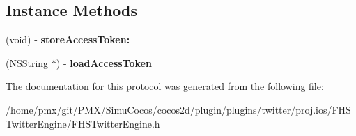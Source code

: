\subsection*{Instance Methods}
\begin{DoxyCompactItemize}
\item 
\mbox{\label{protocolFHSTwitterEngineAccessTokenDelegate_01-p_a9a79cf31ac9ba08b3f0f5dc10ecd35f0}} 
(void) -\/ {\bfseries store\+Access\+Token\+:}
\item 
\mbox{\label{protocolFHSTwitterEngineAccessTokenDelegate_01-p_a09906c4ccecb67614f20ee7e040686ec}} 
(N\+S\+String $\ast$) -\/ {\bfseries load\+Access\+Token}
\end{DoxyCompactItemize}


The documentation for this protocol was generated from the following file\+:\begin{DoxyCompactItemize}
\item 
/home/pmx/git/\+P\+M\+X/\+Simu\+Cocos/cocos2d/plugin/plugins/twitter/proj.\+ios/\+F\+H\+S\+Twitter\+Engine/F\+H\+S\+Twitter\+Engine.\+h\end{DoxyCompactItemize}
